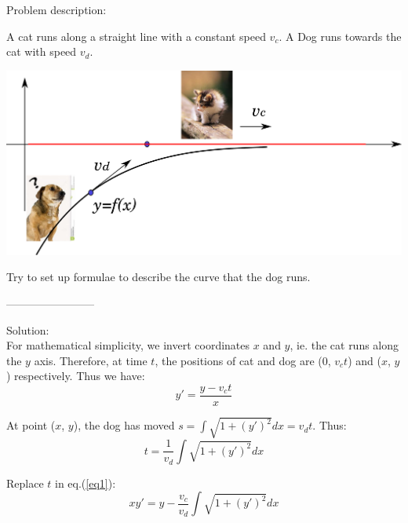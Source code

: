 \documentclass[a4paper,11pt]{article}
\begin{document}
Problem description:

A cat runs along a straight line with a constant speed $v_c$.
A Dog runs towards the cat with speed $v_d$.
\begin{center}
    \includegraphics[width=.7\textwidth]{run.pdf}
\end{center}

Try to set up  formulae to describe the curve that the dog runs.
  \begin{center}------------------------\end{center}

\noindent Solution:~\\

For mathematical simplicity, we invert coordinates $x$ and $y$, ie. the cat
runs along the $y$ axis. Therefore, at time $t$, the positions of cat and
dog are (0, $v_c t$) and ($x$, $y$) respectively. Thus we have:
\begin{equation}\label{eq1}
    y' = \frac{y-v_c t}{x}
\end{equation}

At point ($x$, $y$), the dog has moved $s=\displaystyle{\int}\sqrt{1+(y')^2} dx = v_d t$. Thus:
\begin{equation}\label{eq2}
    t = \frac{1}{v_d}\int \sqrt{1+(y')^2} dx
\end{equation}

Replace $t$ in eq.(\ref{eq1}):
\begin{equation}\label{eq3}
    xy' = y - \frac{v_c}{v_d}\int \sqrt{1+(y')^2}dx
\end{equation}
\end{document}
